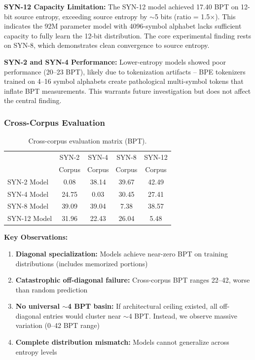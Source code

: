 \documentclass[11pt,a4paper]{article}
\begin{document}
\textbf{SYN-12 Capacity Limitation:} The SYN-12 model achieved 17.40 BPT on 12-bit source entropy, exceeding source entropy by $\sim$5 bits (ratio = 1.5$\times$). This indicates the 92M parameter model with 4096-symbol alphabet lacks sufficient capacity to fully learn the 12-bit distribution. The core experimental finding rests on SYN-8, which demonstrates clean convergence to source entropy.

\textbf{SYN-2 and SYN-4 Performance:} Lower-entropy models showed poor performance (20--23 BPT), likely due to tokenization artifacts -- BPE tokenizers trained on 4--16 symbol alphabets create pathological multi-symbol tokens that inflate BPT measurements. This warrants future investigation but does not affect the central finding.

\subsubsection{Cross-Corpus Evaluation}

\begin{table}[h]
\centering
\small
\begin{tabular}{lcccc}
\toprule
 & SYN-2 & SYN-4 & SYN-8 & SYN-12 \\
 & Corpus & Corpus & Corpus & Corpus \\
\midrule
SYN-2 Model & 0.08 & 38.14 & 39.67 & 42.49 \\
SYN-4 Model & 24.75 & 0.03 & 30.45 & 27.41 \\
SYN-8 Model & 39.09 & 39.04 & 7.38 & 38.57 \\
SYN-12 Model & 31.96 & 22.43 & 26.04 & 5.48 \\
\bottomrule
\end{tabular}
\caption{Cross-corpus evaluation matrix (BPT).}
\label{tab:cross-corpus}
\end{table}

\textbf{Key Observations:}

\begin{enumerate}
\item \textbf{Diagonal specialization:} Models achieve near-zero BPT on training distributions (includes memorized portions)
\item \textbf{Catastrophic off-diagonal failure:} Cross-corpus BPT ranges 22--42, worse than random prediction
\item \textbf{No universal $\sim$4 BPT basin:} If architectural ceiling existed, all off-diagonal entries would cluster near $\sim$4 BPT. Instead, we observe massive variation (0--42 BPT range)
\item \textbf{Complete distribution mismatch:} Models cannot generalize across entropy levels
\end{enumerate}
\end{document}

